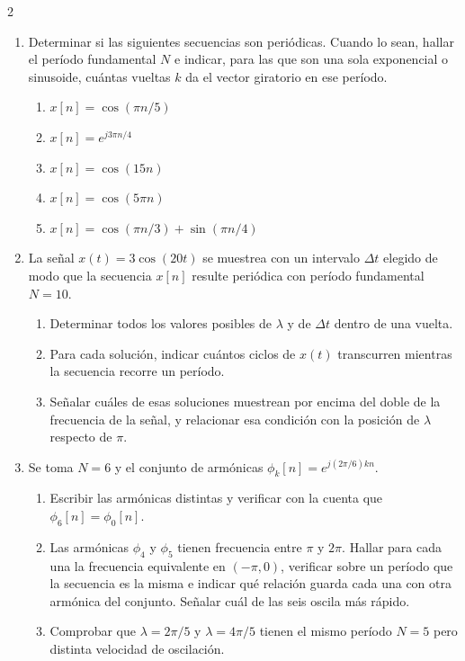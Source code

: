 \documentclass[10pt,a4paper]{article}
\begin{document}
\begin{multicols}{2}
\begin{enumerate}
		\item Determinar si las siguientes secuencias son periódicas. Cuando lo
		sean, hallar el período fundamental $N$ e indicar, para las que son una
		sola exponencial o sinusoide, cuántas vueltas $k$ da el vector giratorio
		en ese período.
		\begin{enumerate}
			\item $x[n] = \cos(\pi n/5)$
			\item $x[n] = e^{j3\pi n/4}$
			\item $x[n] = \cos(15 n)$
			\item $x[n] = \cos(5\pi n)$
			\item $x[n] = \cos(\pi n/3) + \sin(\pi n/4)$
		\end{enumerate}

		\item La señal $x(t) = 3\cos(20t)$ se muestrea con un intervalo
		$\Delta t$ elegido de modo que la secuencia $x[n]$ resulte periódica con
		período fundamental $N = 10$.
		\begin{enumerate}
			\item Determinar todos los valores posibles de $\lambda$ y de
			$\Delta t$ dentro de una vuelta.
			\item Para cada solución, indicar cuántos ciclos de $x(t)$
			transcurren mientras la secuencia recorre un período.
			\item Señalar cuáles de esas soluciones muestrean por encima del
			doble de la frecuencia de la señal, y relacionar esa condición con
			la posición de $\lambda$ respecto de $\pi$.
		\end{enumerate}

		\item Se toma $N = 6$ y el conjunto de armónicas
		$\phi_k[n] = e^{j(2\pi/6)kn}$.
		\begin{enumerate}
			\item Escribir las armónicas distintas y verificar con la cuenta que
			$\phi_6[n] = \phi_0[n]$.
			\item Las armónicas $\phi_4$ y $\phi_5$ tienen frecuencia entre
			$\pi$ y $2\pi$. Hallar para cada una la frecuencia equivalente en
			$(-\pi,0)$, verificar sobre un período que la secuencia es la misma e
			indicar qué relación guarda cada una con otra armónica del conjunto.
			Señalar cuál de las seis oscila más rápido.
			\item Comprobar que $\lambda = 2\pi/5$ y $\lambda = 4\pi/5$ tienen
			el mismo período $N = 5$ pero distinta velocidad de oscilación.
		\end{enumerate}


\end{enumerate}
\end{multicols}
\end{document}
